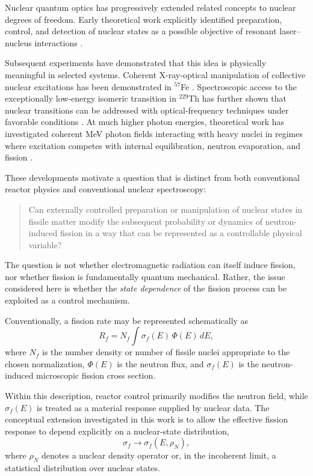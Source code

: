 Nuclear quantum optics has progressively extended related concepts to nuclear degrees of freedom. Early theoretical work explicitly identified preparation, control, and detection of nuclear states as a possible objective of resonant laser--nucleus interactions \cite{Buervenich2006}.

Subsequent experiments have demonstrated that this idea is physically meaningful in selected systems. Coherent X-ray-optical manipulation of collective nuclear excitations has been demonstrated in $^{57}$Fe \cite{Heeg2021}. Spectroscopic access to the exceptionally low-energy isomeric transition in $^{229}$Th has further shown that nuclear transitions can be addressed with optical-frequency techniques under favorable conditions \cite{Yamaguchi2024}. At much higher photon energies, theoretical work has investigated coherent MeV photon fields interacting with heavy nuclei in regimes where excitation competes with internal equilibration, neutron evaporation, and fission \cite{Palffy2015}.

These developments motivate a question that is distinct from both conventional reactor physics and conventional nuclear spectroscopy:

\begin{quote}
Can externally controlled preparation or manipulation of nuclear states in fissile matter modify the subsequent probability or dynamics of neutron-induced fission in a way that can be represented as a controllable physical variable?
\end{quote}

The question is not whether electromagnetic radiation can itself induce fission, nor whether fission is fundamentally quantum mechanical. Rather, the issue considered here is whether the \emph{state dependence} of the fission process can be exploited as a control mechanism.

Conventionally, a fission rate may be represented schematically as
\begin{equation}
R_f
=
N_f
\int
\sigma_f(E)\,
\Phi(E)\,
dE,
\label{eq:conventional_fission_rate_intro}
\end{equation}
where $N_f$ is the number density or number of fissile nuclei appropriate to the chosen normalization, $\Phi(E)$ is the neutron flux, and $\sigma_f(E)$ is the neutron-induced microscopic fission cross section.

Within this description, reactor control primarily modifies the neutron field, while $\sigma_f(E)$ is treated as a material response supplied by nuclear data. The conceptual extension investigated in this work is to allow the effective fission response to depend explicitly on a nuclear-state distribution,
\begin{equation}
\sigma_f
\rightarrow
\sigma_f(E,\rho_N),
\label{eq:sigma_state_intro}
\end{equation}
where $\rho_N$ denotes a nuclear density operator or, in the incoherent limit, a statistical distribution over nuclear states.

